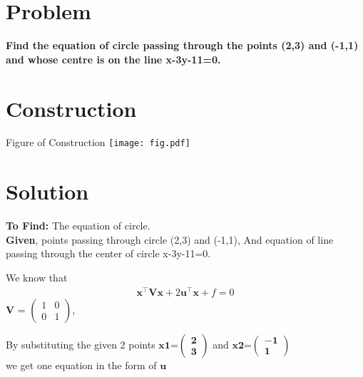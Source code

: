 \documentclass[10pt, a4paper]{article}
\let\vec\mathbf
\begin{document}
\title{\mytitle}
\author{\myauthor\hspace{1em}\\\contact\\FWC22008\hspace{6.5em}IITH\hspace{0.5em}\mymodule\hspace{6em}ASSIGN-4}
\date{}
	\maketitle
		
	\tableofcontents
\vspace{5mm}
   \section{Problem}
\textbf{Find the equation of circle passing through the points (2,3) and (-1,1) and whose centre is on the line x-3y-11=0.}
 \section{Construction}
 	\begin{center}
     Figure of Construction
     \texttt{[image: fig.pdf]} 
  	\end{center}

   \section{Solution}


\vspace{.25 cm}
\textbf{To Find:}
 The equation of circle.\\
\textbf{Given}, points passing through circle (2,3) and (-1,1), And equation of line passing through the center of circle x-3y-11=0. 

We know that 
\begin{align}
\vec{x}^{\top}\vec{V}\vec{x}+2\vec{u}^{\top}\vec{x}+f=0
\end{align}	
$\vec{V}$ = $\begin{pmatrix}
 1 & 0\\
 0 & 1
 \end{pmatrix}$,
 
 By substituting the given 2 points  
  $\vec{x1}$=$\vec{\begin{pmatrix}2 \\3 \end{pmatrix}}$
 and
 $\vec{x2}$=$\vec{\begin{pmatrix}-1 \\1 \end{pmatrix}}$\\
 we get one equation in the form of $\vec{u}$\\
 
\end{document}

